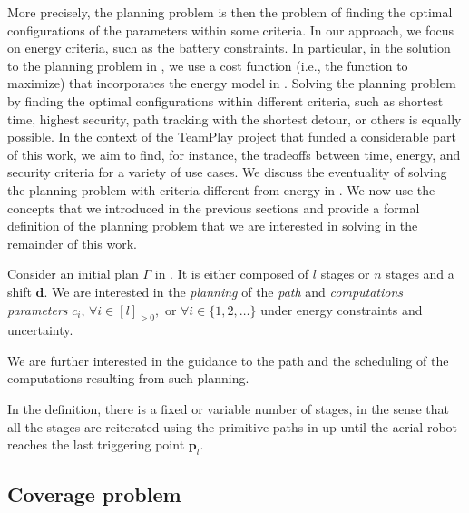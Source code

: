 More precisely, the planning problem is then the problem of finding the optimal configurations of the parameters within some criteria. In our approach, we focus on energy criteria, such as the battery constraints. In particular, in the solution to the planning problem in , we use a cost function (i.e., the function to maximize) that incorporates the energy model in . Solving the planning problem by finding the optimal configurations within different criteria, such as shortest time, highest security, path tracking with the shortest detour, or others is equally possible. In the context of the TeamPlay project that funded a considerable part of this work, we aim to find, for instance, the tradeoffs between time, energy, and security criteria for a variety of use cases. We discuss the eventuality of solving the planning problem with criteria different from energy in . We now use the concepts that we introduced in the previous sections and provide a formal definition of the planning problem that we are interested in solving in the remainder of this work.

\begin{highlight}
\begin{pb}\label{pb}
  Consider an initial plan $\Gamma$ in . It is either composed of $l$ stages or $n$ stages and a shift $\mathbf{d}$. We are interested in the \emph{planning} of the \emph{path} and \emph{computations parameters} $c_i,\,\forall i\in[l]_{>0},$ or $\forall i\in\{1,2,\dots\}$ under energy constraints and uncertainty.
  
  We are further interested in the guidance to the path and the scheduling of the computations resulting from such planning.
\end{pb}    
\end{highlight}

In the definition, there is a fixed or variable number of stages, in the sense that all the stages are reiterated using the primitive paths in  up until the aerial robot reaches the last triggering point $\mathbf{p}_l$.


\subsection{Coverage problem}


